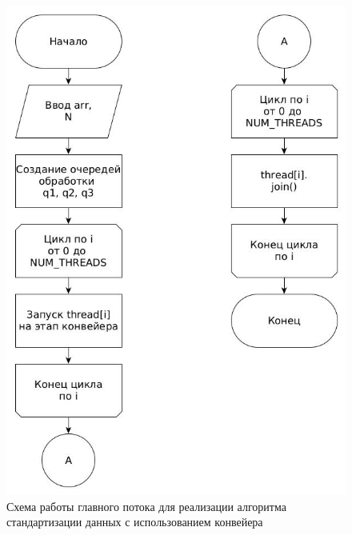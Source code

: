 \FloatBarrier
\begin{figure}[hp]
	\label{classic}
	\begin{center}
		\includegraphics[width=\linewidth]{graph/paral.jpg}
	\end{center}
	\caption{Схема работы главного потока для реализации алгоритма стандартизации данных с использованием конвейера}
\end{figure}
\FloatBarrier


